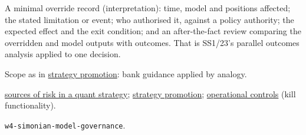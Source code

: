 \begin{qfmethod}
 A minimal override record (interpretation): time, model and positions affected; the stated limitation or event; who authorised it, against a policy authority; the expected effect and the exit condition; and an after-the-fact review comparing the overridden and model outputs with outcomes. That is SS1/23's parallel outcomes analysis applied to one decision.

 Scope as in \hyperref[meth:strategy-promotion-criteria]{strategy promotion}: bank guidance applied by analogy.

 \hyperref[def:quant-strategy-risk-sources]{sources of risk in a quant strategy}; \hyperref[meth:strategy-promotion-criteria]{strategy promotion}; \hyperref[meth:automated-trading-operational-controls]{operational controls} (kill functionality).

 \nolinkurl{w4-simonian-model-governance}.

\end{qfmethod}
